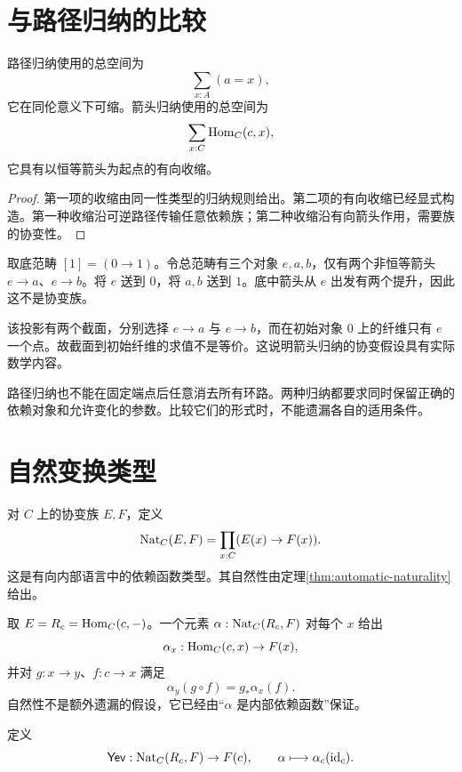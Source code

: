 \section{与路径归纳的比较}
\begin{proposition}[两类基点总空间]
路径归纳使用的总空间为
\[
\sum_{x:A}(a=x),
\]
它在同伦意义下可缩。箭头归纳使用的总空间为
\[
\sum_{x:C}\operatorname{Hom}_C(c,x),
\]
它具有以恒等箭头为起点的有向收缩。
\end{proposition}
\begin{proof}
第一项的收缩由同一性类型的归纳规则给出。第二项的有向收缩已经显式构造。第一种收缩沿可逆路径传输任意依赖族；第二种收缩沿有向箭头作用，需要族的协变性。
\end{proof}
\begin{example}[没有协变性时的失败]
取底范畴 $[1]=(0\to1)$。令总范畴有三个对象 $e,a,b$，仅有两个非恒等箭头 $e\to a$、$e\to b$。将 $e$ 送到 $0$，将 $a,b$ 送到 $1$。底中箭头从 $e$ 出发有两个提升，因此这不是协变族。

该投影有两个截面，分别选择 $e\to a$ 与 $e\to b$，而在初始对象 $0$ 上的纤维只有 $e$ 一个点。故截面到初始纤维的求值不是等价。这说明箭头归纳的协变假设具有实际数学内容。
\end{example}
\begin{remark}
路径归纳也不能在固定端点后任意消去所有环路。两种归纳都要求同时保留正确的依赖对象和允许变化的参数。比较它们的形式时，不能遗漏各自的适用条件。
\end{remark}

\section{自然变换类型}
\begin{definition}[协变族之间的自然变换]
对 $C$ 上的协变族 $E,F$，定义
\[
\operatorname{Nat}_C(E,F)=\prod_{x:C}(E(x)\to F(x)).
\]
这是有向内部语言中的依赖函数类型。其自然性由定理\ref{thm:automatic-naturality}给出。
\end{definition}
\begin{example}
取 $E=R_c=\operatorname{Hom}_C(c,-)$。一个元素 $\alpha:\operatorname{Nat}_C(R_c,F)$ 对每个 $x$ 给出
\[
\alpha_x:\operatorname{Hom}_C(c,x)\to F(x),
\]
并对 $g:x\to y$、$f:c\to x$ 满足
\[
\alpha_y(g\circ f)=g_*\alpha_x(f).
\]
自然性不是额外遗漏的假设，它已经由“$\alpha$ 是内部依赖函数”保证。
\end{example}
\begin{definition}[在恒等箭头处求值]
定义
\[
\mathsf{Yev}:\operatorname{Nat}_C(R_c,F)\to F(c),
\qquad \alpha\longmapsto\alpha_c(\operatorname{id}_c).
\]
\end{definition}

